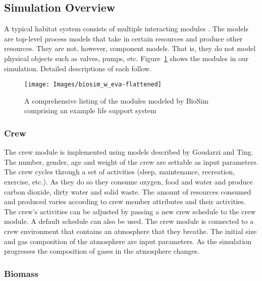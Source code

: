 \documentclass[submit]{aiaa}
\begin{document}
\subsection{Simulation Overview}
\label{sec:sim_overview}

A typical habitat system consists of multiple interacting modules
\cite{alss_reqs03}.  
The models are top-level process models that take in certain resources and produce other resources.  
They are not, however, component models. 
That is, they do not model physical objects such
as valves, pumps, etc.  Figure~\ref{fig:biosim} shows the modules in
our simulation.  Detailed descriptions of each follow. 

\begin{figure}[htb]
\texttt{[image: Images/biosim\_w\_eva-flattened]}
\caption{A comprehensive listing of the modules modeled by BioSim
  comprising an example life support system} 
\label{fig:biosim}
\end{figure}

\subsubsection{Crew}

The crew module is implemented using models described by Goudarzi and
Ting\cite{goudarzi_ting99}.  The number, gender, age and weight of the
crew are settable as input parameters.  The crew cycles through a set
of activities (sleep, maintenance, recreation, exercise, etc.).  As they do so
they consume oxygen, food and water and produce carbon dioxide,
dirty water and solid waste.  The amount of resources consumed and
produced varies according to crew member attributes and their
activities.  The crew's activities can be adjusted by passing a new
crew schedule to the crew module.  A default schedule can also be
used.  The crew module is connected to a crew environment that
contains an atmosphere that they breathe.  The initial size and gas
composition of the atmosphere are input parameters.  As the simulation
progresses the composition of gases in the atmosphere changes.

\subsubsection{Biomass}
\end{document}
